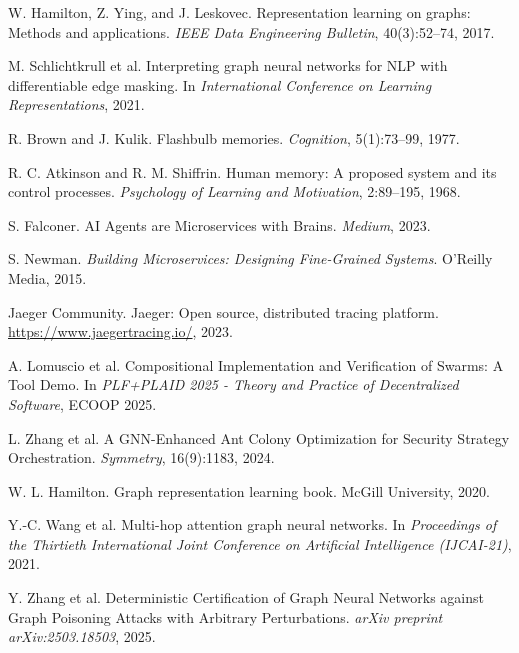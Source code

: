 \documentclass{article}
\begin{document}
\begin{thebibliography}{99}
W. Hamilton, Z. Ying, and J. Leskovec.
\newblock Representation learning on graphs: Methods and applications.
\newblock \emph{IEEE Data Engineering Bulletin}, 40(3):52–74, 2017.

M. Schlichtkrull et al.
\newblock Interpreting graph neural networks for NLP with differentiable edge masking.
\newblock In \emph{International Conference on Learning Representations}, 2021.

R. Brown and J. Kulik.
\newblock Flashbulb memories.
\newblock \emph{Cognition}, 5(1):73–99, 1977.

R. C. Atkinson and R. M. Shiffrin.
\newblock Human memory: A proposed system and its control processes.
\newblock \emph{Psychology of Learning and Motivation}, 2:89–195, 1968.

S. Falconer.
\newblock AI Agents are Microservices with Brains.
\newblock \emph{Medium}, 2023.

S. Newman.
\newblock \emph{Building Microservices: Designing Fine-Grained Systems}.
\newblock O'Reilly Media, 2015.

Jaeger Community.
\newblock Jaeger: Open source, distributed tracing platform.
\newblock \url{https://www.jaegertracing.io/}, 2023.

A. Lomuscio et al.
\newblock Compositional Implementation and Verification of Swarms: A Tool Demo.
\newblock In \emph{PLF+PLAID 2025 - Theory and Practice of Decentralized Software}, ECOOP 2025.

L. Zhang et al.
\newblock A GNN-Enhanced Ant Colony Optimization for Security Strategy Orchestration.
\newblock \emph{Symmetry}, 16(9):1183, 2024.

W. L. Hamilton.
\newblock Graph representation learning book.
\newblock McGill University, 2020.

Y.-C. Wang et al.
\newblock Multi-hop attention graph neural networks.
\newblock In \emph{Proceedings of the Thirtieth International Joint Conference on Artificial Intelligence (IJCAI-21)}, 2021.

Y. Zhang et al.
\newblock Deterministic Certification of Graph Neural Networks against Graph Poisoning Attacks with Arbitrary Perturbations.
\newblock \emph{arXiv preprint arXiv:2503.18503}, 2025.


\end{thebibliography}
\end{document}
